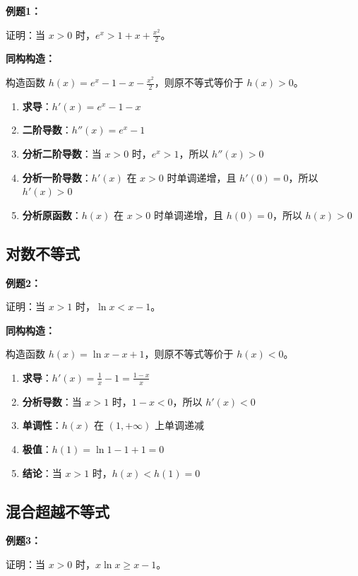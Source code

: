 \documentclass[a4paper,11pt]{ctexrep}
\newcommand{\exampleicon}{\ModeBadge[highlight]{例题}}
\newcommand{\analysisicon}{\ModeBadge[secondary]{分析}}
\theoremstyle{definition}
\begin{document}
\exampleicon \textbf{例题1：}

证明：当 $x > 0$ 时，$e^x > 1 + x + \frac{x^2}{2}$。

\analysisicon \textbf{同构构造：}

构造函数 $h(x) = e^x - 1 - x - \frac{x^2}{2}$，则原不等式等价于 $h(x) > 0$。

\begin{enumerate}
    \item \textbf{求导}：$h'(x) = e^x - 1 - x$
    \item \textbf{二阶导数}：$h''(x) = e^x - 1$
    \item \textbf{分析二阶导数}：当 $x > 0$ 时，$e^x > 1$，所以 $h''(x) > 0$
    \item \textbf{分析一阶导数}：$h'(x)$ 在 $x > 0$ 时单调递增，且 $h'(0) = 0$，所以 $h'(x) > 0$
    \item \textbf{分析原函数}：$h(x)$ 在 $x > 0$ 时单调递增，且 $h(0) = 0$，所以 $h(x) > 0$
\end{enumerate}

\subsection{对数不等式}

\exampleicon \textbf{例题2：}

证明：当 $x > 1$ 时，$\ln x < x - 1$。

\analysisicon \textbf{同构构造：}

构造函数 $h(x) = \ln x - x + 1$，则原不等式等价于 $h(x) < 0$。

\begin{enumerate}
    \item \textbf{求导}：$h'(x) = \frac{1}{x} - 1 = \frac{1-x}{x}$
    \item \textbf{分析导数}：当 $x > 1$ 时，$1-x < 0$，所以 $h'(x) < 0$
    \item \textbf{单调性}：$h(x)$ 在 $(1, +\infty)$ 上单调递减
    \item \textbf{极值}：$h(1) = \ln 1 - 1 + 1 = 0$
    \item \textbf{结论}：当 $x > 1$ 时，$h(x) < h(1) = 0$
\end{enumerate}

\subsection{混合超越不等式}

\exampleicon \textbf{例题3：}

证明：当 $x > 0$ 时，$x\ln x \geq x - 1$。
\end{document}
